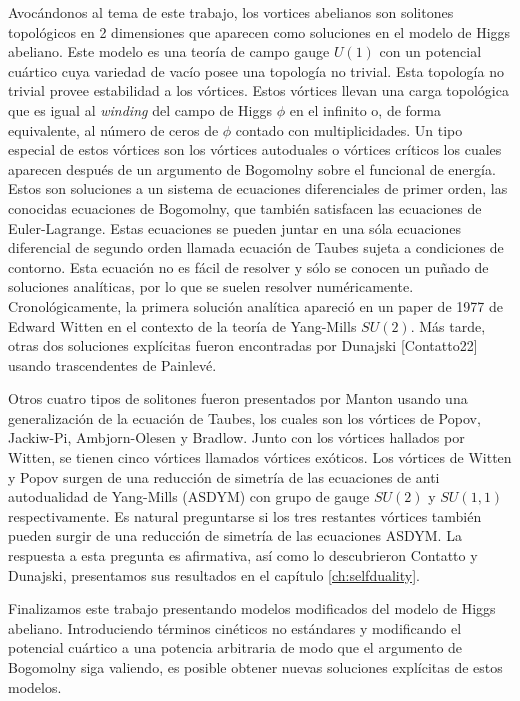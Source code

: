 Avocándonos al tema de este trabajo, los vortices abelianos son solitones topológicos en 2 dimensiones que aparecen como soluciones en el modelo de Higgs abeliano. Este modelo es una teoría de campo gauge $U(1)$ con un potencial cuártico cuya variedad de vacío posee una topología no trivial. Esta topología no trivial provee estabilidad a los vórtices. Estos vórtices llevan una carga topológica que es igual al \emph{winding} del campo de Higgs $\phi$ en el infinito o, de forma equivalente, al número de ceros de $\phi$ contado con multiplicidades. Un tipo especial de estos vórtices son los vórtices autoduales o vórtices críticos los cuales aparecen después de un argumento de Bogomolny sobre el funcional de energía. Estos son soluciones a un sistema de ecuaciones diferenciales de primer orden, las conocidas ecuaciones de Bogomolny, que también satisfacen las ecuaciones de Euler-Lagrange. Estas ecuaciones se pueden juntar en una sóla ecuaciones diferencial de segundo orden llamada ecuación de Taubes sujeta a condiciones de contorno. Esta ecuación no es fácil de resolver y sólo se conocen un puñado de soluciones analíticas, por lo que se suelen resolver numéricamente. Cronológicamente, la primera solución analítica apareció en un paper de 1977 de Edward Witten en el contexto de la teoría de Yang-Mills $SU(2)$. Más tarde, otras dos soluciones explícitas fueron encontradas por Dunajski [Contatto22] usando trascendentes de Painlevé.

Otros cuatro tipos de solitones fueron presentados por Manton usando una generalización de la ecuación de Taubes, los cuales son los vórtices de Popov, Jackiw-Pi, Ambjorn-Olesen y Bradlow. Junto con los vórtices hallados por Witten, se tienen cinco vórtices llamados vórtices exóticos. Los vórtices de Witten y Popov surgen de una reducción de simetría de las ecuaciones de anti autodualidad de Yang-Mills (ASDYM) con grupo de gauge $SU(2)$ y $SU(1,1)$ respectivamente. Es natural preguntarse si los tres restantes vórtices también pueden surgir de una reducción de simetría de las ecuaciones ASDYM. La respuesta a esta pregunta es afirmativa, así como lo descubrieron Contatto y Dunajski, presentamos sus resultados en el capítulo \ref{ch:selfduality}.

Finalizamos este trabajo presentando modelos modificados del modelo de Higgs abeliano. Introduciendo términos cinéticos no estándares y modificando el potencial cuártico a una potencia arbitraria de modo que el argumento de Bogomolny siga valiendo, es posible obtener nuevas soluciones explícitas de estos modelos.

